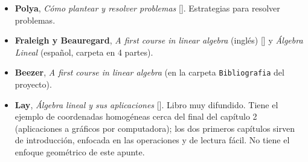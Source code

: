 \begin{itemize}
  [, sólo parte 1]. El capítulo 3 explica las
  transformaciones afines desde las propiedades de las rectas y recién al final arma la
  representación con matrices; el capítulo 2 construye, a partir de reflexiones, todas las
  similaridades (afinidades que no deforman ángulos). Buenos gráficos. En inglés.
  \item \textbf{Polya}, \emph{Cómo plantear y resolver problemas}
  []. Estrategias para resolver
  problemas.
  \item \textbf{Fraleigh y Beauregard}, \emph{A first course in linear algebra} (inglés)
  [] y
  \emph{Álgebra Lineal} (español, carpeta en 4 partes).
  \item \textbf{Beezer}, \emph{A first course in linear algebra} (en la carpeta
  \texttt{Bibliografia} del proyecto).
  \item \textbf{Lay}, \emph{Álgebra lineal y sus aplicaciones}
  []. Libro muy difundido. Tiene el ejemplo de
  coordenadas homogéneas cerca del final del capítulo 2 (aplicaciones a gráficos por
  computadora); los dos primeros capítulos sirven de introducción, enfocada en las operaciones
  y de lectura fácil. No tiene el enfoque geométrico de este apunte.
\end{itemize}

